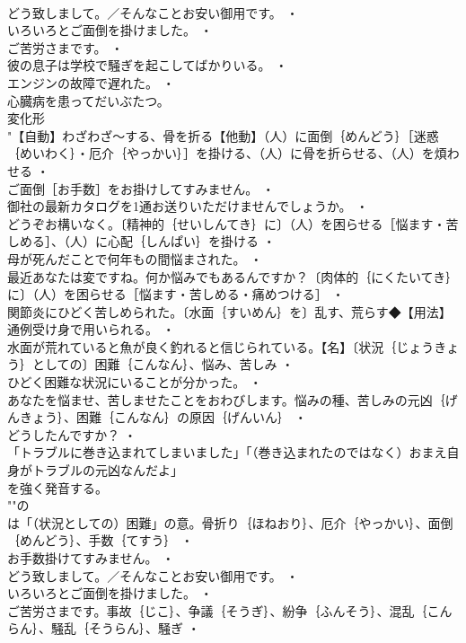 \documentclass[8pt]{extreport}
\begin{document}
\begin{CJK}{UTF8}{min}
\\	どう致しまして。／そんなことお安い御用です。 ・
\\	いろいろとご面倒を掛けました。 ・
\\	ご苦労さまです。 ・
\\	彼の息子は学校で騒ぎを起こしてばかりいる。 ・
\\	エンジンの故障で遅れた。 ・
\\	心臓病を患ってだいぶたつ。
\\	変化形 
\\	"【自動】わざわざ～する、骨を折る【他動】（人）に面倒｛めんどう｝［迷惑｛めいわく｝・厄介｛やっかい｝］を掛ける、（人）に骨を折らせる、（人）を煩わせる ・
\\	ご面倒［お手数］をお掛けしてすみません。 ・
\\	御社の最新カタログを1通お送りいただけませんでしょうか。 ・
\\	どうぞお構いなく。〔精神的｛せいしんてき｝に〕（人）を困らせる［悩ます・苦しめる］、（人）に心配｛しんぱい｝を掛ける ・
\\	母が死んだことで何年もの間悩まされた。 ・
\\	最近あなたは変ですね。何か悩みでもあるんですか？〔肉体的｛にくたいてき｝に〕（人）を困らせる［悩ます・苦しめる・痛めつける］ ・
\\	関節炎にひどく苦しめられた。〔水面｛すいめん｝を〕乱す、荒らす◆【用法】通例受け身で用いられる。 ・
\\	水面が荒れていると魚が良く釣れると信じられている。【名】〔状況｛じょうきょう｝としての〕困難｛こんなん｝、悩み、苦しみ ・
\\	ひどく困難な状況にいることが分かった。 ・
\\	あなたを悩ませ、苦しませたことをおわびします。悩みの種、苦しみの元凶｛げんきょう｝、困難｛こんなん｝の原因｛げんいん｝ ・
\\	どうしたんですか？ ・
\\	「トラブルに巻き込まれてしまいました」「（巻き込まれたのではなく）おまえ自身がトラブルの元凶なんだよ」
\\	を強く発音する。
\\	""の
\\	は「（状況としての）困難」の意。骨折り｛ほねおり｝、厄介｛やっかい｝、面倒｛めんどう｝、手数｛てすう｝ ・
\\	お手数掛けてすみません。 ・
\\	どう致しまして。／そんなことお安い御用です。 ・
\\	いろいろとご面倒を掛けました。 ・
\\	ご苦労さまです。事故｛じこ｝、争議｛そうぎ｝、紛争｛ふんそう｝、混乱｛こんらん｝、騒乱｛そうらん｝、騒ぎ ・

\end{CJK}
\end{document}
